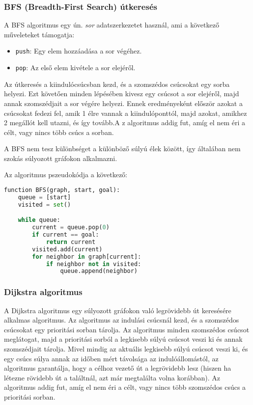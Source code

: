 \subsubsection{BFS (Breadth-First Search) útkeresés}

A BFS algoritmus egy ún. \textit{sor} adatszerkezetet használ\cite{russell2020artificial}, ami a következő műveleteket támogatja:

\begin{itemize}
    \item \texttt{push}: Egy elem hozzáadása a sor végéhez.
    \item \texttt{pop}: Az első elem kivétele a sor elejéről.
\end{itemize}

Az útkeresés a kiindulócsúcsban kezd, és a szomszédos csúcsokat egy sorba helyezi. Ezt követően minden lépésében kivesz egy csúcsot a sor elejéről, majd annak szomszédjait a sor végére helyezi. Ennek eredményeként először azokat a csúcsokat fedezi fel, amik 1 élre vannak a kiindulóponttól, majd azokat, amikhez 2 megállót kell utazni, és így tovább\cite{russell2020artificial}.A z algoritmus addig fut, amíg el nem éri a célt, vagy nincs több csúcs a sorban.

A BFS nem tesz különbséget a különböző súlyú élek között, így általában nem szokás súlyozott gráfokon alkalmazni\cite{russell2020artificial}.

Az algoritmus pszeudokódja a következő:

\begin{lstlisting}[language={Python}]
function BFS(graph, start, goal):
    queue = [start]
    visited = set()

    while queue:
        current = queue.pop(0)
        if current == goal:
            return current
        visited.add(current)
        for neighbor in graph[current]:
            if neighbor not in visited:
                queue.append(neighbor)
\end{lstlisting}

\subsubsection{Dijkstra algoritmus}

A Dijkstra algoritmus egy súlyozott gráfokon való legrövidebb út\cite{russell2020artificial} keresésére alkalmas algoritmus. Az algoritmus az indulási csúcsnál kezd, és a szomszédos csúcsokat egy prioritási sorban tárolja. Az algoritmus minden szomszédos csúcsot meglátogat, majd a prioritási sorból a legkisebb súlyú csúcsot veszi ki és annak szomszédjait tárolja. Mivel mindig az aktuális legkisebb súlyú csúcsot veszi ki, és egy csúcs súlya annak az időben mért távolsága az indulóállomástól, az algoritmus garantálja, hogy a célhoz vezető út a legrövidebb lesz (hiszen ha létezne rövidebb út a találtnál, azt már megtalálta volna korábban). Az algoritmus addig fut, amíg el nem éri a célt, vagy nincs több szomszédos csúcs a prioritási sorban.

